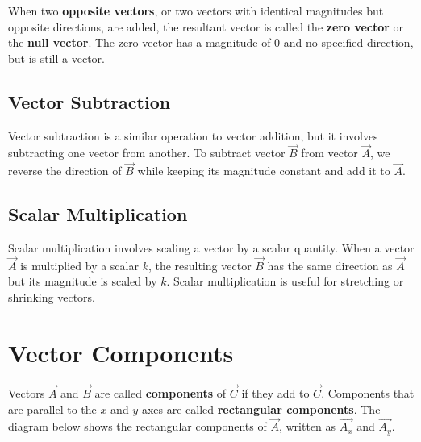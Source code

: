 \documentclass[11pt]{article}
\begin{document}
When two \textbf{opposite vectors}, or two vectors with identical magnitudes but opposite directions, are added, the resultant vector is called the \textbf{zero vector} or the \textbf{null vector}. The zero vector has a magnitude of $0$ and no specified direction, but is still a vector.

\subsection{Vector Subtraction}
Vector subtraction is a similar operation to vector addition, but it involves subtracting one vector from another. To subtract vector \(\Vec{B}\) from vector \(\Vec{A}\), we reverse the direction of \(\Vec{B}\) while keeping its magnitude constant and add it to \(\Vec{A}\). 

\subsection{Scalar Multiplication}
Scalar multiplication involves scaling a vector by a scalar quantity. When a vector \(\Vec{A}\) is multiplied by a scalar \(k\), the resulting vector \(\Vec{B}\) has the same direction as \(\Vec{A}\) but its magnitude is scaled by \(k\). Scalar multiplication is useful for stretching or shrinking vectors. 


\section{Vector Components}

Vectors \(\Vec{A}\) and \(\Vec{B}\) are called \textbf{components} of \(\Vec{C}\) if they add to \(\Vec{C}\). Components that are parallel to the $x$ and $y$ axes are called \textbf{rectangular components}. The diagram below shows the rectangular components of \(\Vec{A}\), written as \(\Vec{A_x}\) and \(\Vec{A_y}\).

\begin{center}
\end{center}
\end{document}
